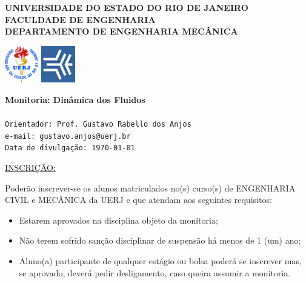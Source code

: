 \documentclass[a4paper,portuguese,12pt]{article}
\begin{document}
\thispagestyle{empty}

\begin{minipage}{0.72\linewidth}
	\normalsize\textbf{UNIVERSIDADE DO ESTADO DO RIO DE JANEIRO\\
	              FACULDADE DE ENGENHARIA\\
				  DEPARTAMENTO DE ENGENHARIA MECÂNICA}
\end{minipage}
\begin{minipage}{0.27\linewidth}
	\flushright
	\includegraphics[height=16mm]{figs/logouerj.jpg}
	\hspace{.5cm}
	\includegraphics[height=16mm]{figs/fen.png}
\end{minipage}

\hrulefill

\Large \color{NavyBlue} \textbf{Monitoria: Dinâmica dos Fluidos}\\
\color{Black}\\ 
\normalsize \texttt{Orientador: Prof. Gustavo Rabello dos Anjos}\\
\normalsize \texttt{e-mail: gustavo.anjos@uerj.br}\\
\normalsize \texttt{Data de divulgação: \today}

\vspace{1cm}

\underline{INSCRIÇÃO:}

Poderão inscrever-se os alunos matriculados no(s) curso(s) de ENGENHARIA
CIVIL e MECÂNICA da UERJ e que atendam aos seguintes requisitos:

\begin{itemize}
	\item Estarem aprovados na disciplina objeto da monitoria;
	\item Não terem sofrido sanção disciplinar de suspensão há menos de
	1 (um) ano;
	\item Aluno(a) participante de qualquer estágio ou bolsa poderá se
	inscrever mas, se aprovado, deverá pedir desligamento, caso queira
	assumir a monitoria.
\end{itemize}
\end{document}
